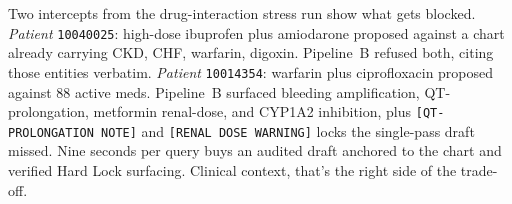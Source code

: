 \documentclass[twocolumn,10pt,main=USenglish]{asmeconf}
\begin{document}
Two intercepts from the drug-interaction stress run show what gets
blocked. \emph{Patient} \texttt{10040025}: high-dose ibuprofen plus
amiodarone proposed against a chart already carrying CKD, CHF,
warfarin, digoxin. Pipeline~B refused both, citing those entities
verbatim. \emph{Patient} \texttt{10014354}: warfarin plus
ciprofloxacin proposed against \num{88} active meds. Pipeline~B
surfaced bleeding amplification, QT-prolongation, metformin
renal-dose, and CYP1A2 inhibition, plus
\texttt{[QT-PROLONGATION NOTE]} and \texttt{[RENAL DOSE WARNING]}
locks the single-pass draft missed. Nine seconds per query buys
an audited draft anchored to the chart and verified Hard Lock
surfacing. Clinical context, that's the right side of the
trade-off.



\end{document}
